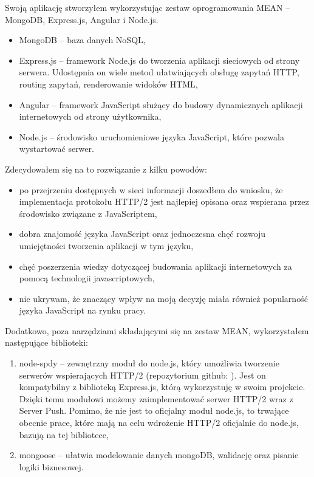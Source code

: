\documentclass[a4paper,12pt,twoside,openany]{report}
\begin{document}
Swoją aplikację stworzyłem wykorzystując zestaw oprogramowania MEAN\cite{mean} -- MongoDB, Express.js, Angular i Node.js.

\begin{itemize}
	\item MongoDB -- baza danych NoSQL,
	\item Express.js -- framework Node.js do tworzenia aplikacji sieciowych od strony serwera.
	Udostępnia on wiele metod ułatwiających obsługę zapytań HTTP, routing zapytań, renderowanie widoków HTML,
	\item Angular -- framework JavaScript służący do budowy dynamicznych aplikacji internetowych od strony użytkownika,
	\item Node.js -- środowisko uruchomieniowe języka JavaScript, które pozwala wystartować serwer.
\end{itemize}

Zdecydowałem się na to rozwiązanie z kilku powodów:

\begin{itemize}
	\item po przejrzeniu dostępnych w sieci informacji doszedłem do wniosku, że implementacja protokołu HTTP/2 jest najlepiej opisana oraz wspierana przez środowisko związane z JavaScriptem,
	\item dobra znajomość języka JavaScript oraz jednoczesna chęć rozwoju umiejętności tworzenia aplikacji w tym języku,
	\item chęć poszerzenia wiedzy dotyczącej budowania aplikacji internetowych za pomocą technologii javascriptowych,
	\item nie ukrywam, że znaczący wpływ na moją decyzję miała również popularność języka JavaScript na rynku pracy.
\end{itemize}

Dodatkowo, poza narzędziami składającymi się na zestaw MEAN, wykorzystałem następujące biblioteki:
\begin{enumerate}
	\item node-spdy -- zewnętrzny moduł do node.js, który umożliwia tworzenie serwerów wspierających HTTP/2 (repozytorium github: \cite{spdy}).
	Jest on kompatybilny z biblioteką Express.js, którą wykorzystuję w swoim projekcie.
	Dzięki temu modułowi możemy zaimplementować serwer HTTP/2 wraz z Server Push.
	Pomimo, że nie jest to oficjalny moduł node.js, to trwające obecnie prace, które mają na celu wdrożenie HTTP/2 oficjalnie do node.js, bazują na tej bibliotece,
	\item mongoose -- ułatwia modelowanie danych mongoDB, walidację oraz pisanie logiki biznesowej. 
\end{enumerate}
\end{document}
